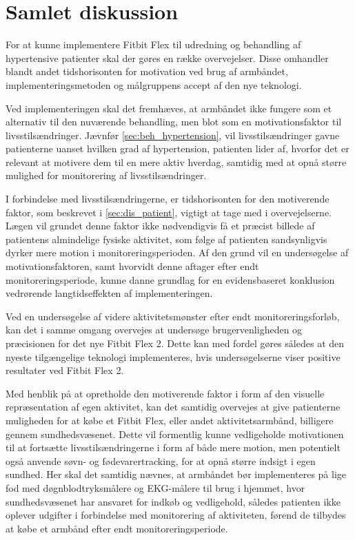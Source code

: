 \section{Samlet diskussion}

For at kunne implementere Fitbit Flex til udredning og behandling af hypertensive patienter skal der gøres en række overvejelser. Disse omhandler blandt andet tidshorisonten for motivation ved brug af armbåndet, implementeringsmetoden og målgruppens accept af den nye teknologi. 

Ved implementeringen skal det fremhæves, at armbåndet ikke fungere som et alternativ til den nuværende behandling, men blot som en motivationsfaktor til livsstilsændringer. Jævnfør \autoref{sec:beh_hypertension}, vil livsstilsændringer gavne patienterne uanset hvilken grad af hypertension, patienten lider af, hvorfor det er relevant at motivere dem til en mere aktiv hverdag, samtidig med at opnå større mulighed for monitorering af livsstilsændringer.

I forbindelse med livsstilsændringerne, er tidshorisonten for den motiverende faktor, som beskrevet i \autoref{sec:dis_patient}, vigtigt at tage med i overvejelserne. Lægen vil grundet denne faktor ikke nødvendigvis få et præcist billede af patientens almindelige fysiske aktivitet, som følge af patienten sandsynligvis dyrker mere motion i monitoreringsperioden. Af den grund vil en undersøgelse af motivationsfaktoren, samt hvorvidt denne aftager efter endt monitoreringsperiode, kunne danne grundlag for en evidensbaseret konklusion vedrørende langtidseffekten af implementeringen.

Ved en undersøgelse af videre aktivitetsmønster efter endt monitoreringsforløb, kan det i samme omgang overvejes at undersøge brugervenligheden og præcisionen for det nye Fitbit Flex 2. Dette kan med fordel gøres således at den nyeste tilgængelige teknologi implementeres, hvis undersøgelserne viser positive resultater ved Fitbit Flex 2.

Med henblik på at opretholde den motiverende faktor i form af den visuelle repræsentation af egen aktivitet, kan det samtidig overvejes at give patienterne muligheden for at købe et Fitbit Flex, eller andet aktivitetsarmbånd, billigere gennem sundhedsvæsenet. Dette vil formentlig kunne vedligeholde motivationen til at fortsætte livsstilsændringerne i form af både mere motion, men potentielt også anvende søvn- og fødevarertracking, for at opnå større indsigt i egen sundhed. Her skal det samtidig nævnes, at armbåndet bør implementeres på lige fod med døgnblodtryksmålere og EKG-målere til brug i hjemmet, hvor sundhedsvæsenet har ansvaret for indkøb og vedligehold, således patienten ikke oplever udgifter i forbindelse med monitorering af aktiviteten, førend de tilbydes at købe et armbånd efter endt monitoreringsperiode.

